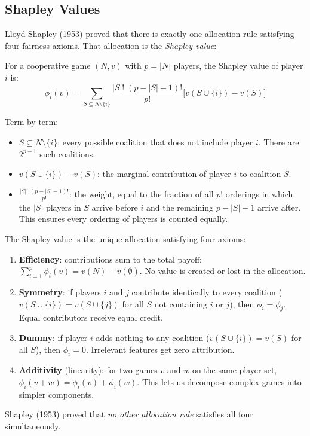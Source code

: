 \subsection{Shapley Values}

Lloyd Shapley (1953) proved that there is exactly one allocation rule satisfying four fairness axioms.
That allocation is the \emph{Shapley value}:

\begin{definition}
For a cooperative game $(N, v)$ with $p = |N|$ players, the Shapley value of player $i$ is:
\begin{equation}
\phi_i(v) = \sum_{S \subseteq N \setminus \{i\}} \frac{|S|!\;(p - |S| - 1)!}{p!} \Big[ v(S \cup \{i\}) - v(S) \Big]
\label{eq:shapley-value}
\end{equation}

Term by term:
\begin{itemize}[nosep]
  \item $S \subseteq N \setminus \{i\}$: every possible coalition that does not include player $i$. There are $2^{p-1}$ such coalitions.
  \item $v(S \cup \{i\}) - v(S)$: the marginal contribution of player $i$ to coalition $S$.
  \item $\frac{|S|!\;(p - |S| - 1)!}{p!}$: the weight, equal to the fraction of all $p!$ orderings in which the $|S|$ players in $S$ arrive before $i$ and the remaining $p - |S| - 1$ arrive after. This ensures every ordering of players is counted equally.
\end{itemize}
\end{definition}

The Shapley value is the unique allocation satisfying four axioms:

\begin{keyidea}
\begin{enumerate}[nosep]
  \item \textbf{Efficiency}: contributions sum to the total payoff: $\sum_{i=1}^p \phi_i(v) = v(N) - v(\emptyset)$.
  No value is created or lost in the allocation.

  \item \textbf{Symmetry}: if players $i$ and $j$ contribute identically to every coalition ($v(S \cup \{i\}) = v(S \cup \{j\})$ for all $S$ not containing $i$ or $j$), then $\phi_i = \phi_j$.
  Equal contributors receive equal credit.

  \item \textbf{Dummy}: if player $i$ adds nothing to any coalition ($v(S \cup \{i\}) = v(S)$ for all $S$), then $\phi_i = 0$.
  Irrelevant features get zero attribution.

  \item \textbf{Additivity} (linearity): for two games $v$ and $w$ on the same player set, $\phi_i(v + w) = \phi_i(v) + \phi_i(w)$.
  This lets us decompose complex games into simpler components.
\end{enumerate}
Shapley (1953) proved that \emph{no other allocation rule} satisfies all four simultaneously.
\end{keyidea}


